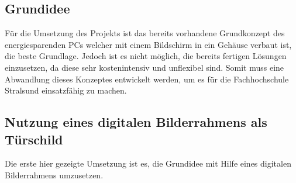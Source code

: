 \begin{flushleft}
\subsection{Grundidee}
Für die Umsetzung des Projekts ist das bereits vorhandene Grundkonzept des energiesparenden PCs welcher mit einem Bildschirm in ein Gehäuse verbaut ist, die beste Grundlage. Jedoch ist es nicht möglich, die bereits fertigen Lösungen einzusetzen, da diese sehr kostenintensiv und unflexibel sind. Somit muss eine Abwandlung dieses Konzeptes entwickelt werden, um es für die Fachhochschule Stralsund einsatzfähig zu machen. 

\subsection{Nutzung eines digitalen Bilderrahmens als Türschild}
Die erste hier gezeigte Umsetzung ist es, die Grundidee mit Hilfe eines digitalen Bilderrahmens umzusetzen. 


\end{flushleft}

% 


